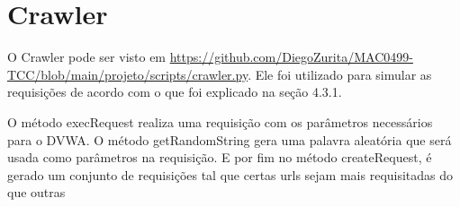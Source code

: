 
\chapter{Crawler}
\label{ap:crawler}

O Crawler pode ser visto em \url{https://github.com/DiegoZurita/MAC0499-TCC/blob/main/projeto/scripts/crawler.py}.
Ele foi utilizado para simular as requisições de acordo com o que foi explicado na seção 4.3.1.

O método execRequest realiza uma requisição com os parâmetros necessários para o DVWA. 
O método getRandomString gera uma palavra aleatória que será usada como parâmetros na requisição.
E por fim no método createRequest, é gerado um conjunto de requisições tal que certas urls sejam mais
requisitadas do que outras



